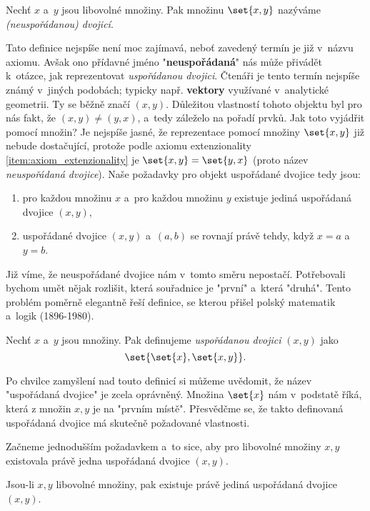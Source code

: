 \begin{definition}[Dvojice]
    Nechť $x$ a~$y$ jsou libovolné množiny. Pak množinu $\set{x,y}$ nazýváme \emph{(neuspořádanou) dvojicí}.
\end{definition}
Tato definice nejspíše není moc zajímavá, neboť zavedený termín je již v~názvu axiomu. Avšak ono přídavné jméno "\textbf{neuspořádaná}" nás může přivádět k~otázce, jak reprezentovat \emph{uspořádanou dvojici}. Čtenáři je tento termín nejspíše známý v~jiných podobách; typicky např. \textbf{vektory} využívané v~analytické geometrii. Ty se běžně značí $(x,y)$. Důležitou vlastností tohoto objektu byl pro nás fakt, že $(x,y)\neq (y,x)$, a~tedy záleželo na pořadí prvků. Jak toto vyjádřit pomocí množin? Je nejspíše jasné, že reprezentace pomocí množiny $\set{x,y}$ již nebude dostačující, protože podle axiomu extenzionality \ref{item:axiom_extenzionality} je $\set{x,y}=\set{y,x}$ (proto název \emph{neuspořádaná dvojice}). Naše požadavky pro objekt uspořádané dvojice tedy jsou:
\begin{enumerate}
    \item pro každou množinu $x$ a~pro každou množinu $y$ existuje jediná uspořádaná dvojice $(x,y)$,
    \item uspořádané dvojice $(x,y)$ a~$(a,b)$ se rovnají právě tehdy, když $x=a$ a~$y=b$.
\end{enumerate}
Již víme, že neuspořádané dvojice nám v~tomto směru nepostačí. Potřebovali bychom umět nějak rozlišit, která souřadnice je "první" a~která "druhá". Tento problém poměrně elegantně řeší definice, se kterou přišel polský matematik a~logik  \mbox{(1896-1980)}.
\begin{definition}\label{def:usporadana_dvojice}
    Nechť $x$ a~$y$ jsou množiny. Pak definujeme \emph{uspořádanou dvojici} $(x,y)$ jako
    \begin{equation*}
        \set{\set{x},\set{x,y}}.
    \end{equation*}
\end{definition}
Po chvilce zamyšlení nad touto definicí si můžeme uvědomit, že název "uspořádaná dvojice" je zcela oprávněný. Množina $\set{x}$ nám v~podstatě  říká, která z množin $x,y$ je na "prvním místě". Přesvědčme se, že takto definovaná uspořádaná dvojice má skutečně požadované vlastnosti.\par
Začneme jednodušším požadavkem a~to sice, aby pro libovolné množiny $x,y$ existovala právě jedna uspořádaná dvojice $(x,y)$.
\begin{lemma}
    Jsou-li $x,y$ libovolné množiny, pak existuje právě jediná uspořádaná dvojice $(x,y)$.
\end{lemma}
